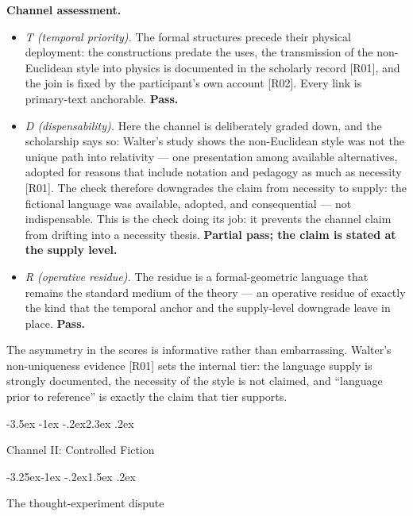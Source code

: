 \documentclass[11pt,a4paper]{article}
\makeatletter
\renewcommand\section{\@startsection{section}{1}{\z@}%
  {-3.5ex \@plus -1ex \@minus -.2ex}{2.3ex \@plus .2ex}%
  {\normalfont\Large\bfseries\raggedright}}
\renewcommand\subsection{\@startsection{subsection}{2}{\z@}%
  {-3.25ex\@plus -1ex \@minus -.2ex}{1.5ex \@plus .2ex}%
  {\normalfont\large\bfseries\raggedright}}
\makeatother
\begin{document}
\textbf{Channel assessment.}

\begin{itemize}[leftmargin=1.6em,itemsep=2pt,parsep=0pt,topsep=3pt]
\item \textit{T (temporal priority).} The formal structures precede their physical deployment: the constructions predate the uses, the transmission of the non-Euclidean style into physics is documented in the scholarly record [R01], and the join is fixed by the participant's own account [R02]. Every link is primary-text anchorable. \textbf{Pass.}
\item \textit{D (dispensability).} Here the channel is deliberately graded down, and the scholarship says so: Walter's study shows the non-Euclidean style was not the unique path into relativity — one presentation among available alternatives, adopted for reasons that include notation and pedagogy as much as necessity [R01]. The check therefore downgrades the claim from necessity to supply: the fictional language was available, adopted, and consequential — not indispensable. This is the check doing its job: it prevents the channel claim from drifting into a necessity thesis. \textbf{Partial pass; the claim is stated at the supply level.}
\item \textit{R (operative residue).} The residue is a formal-geometric language that remains the standard medium of the theory — an operative residue of exactly the kind that the temporal anchor and the supply-level downgrade leave in place. \textbf{Pass.}
\end{itemize}

The asymmetry in the scores is informative rather than embarrassing. Walter's non-uniqueness evidence [R01] sets the internal tier: the language supply is strongly documented, the necessity of the style is not claimed, and ``language prior to reference'' is exactly the claim that tier supports.

\section{Channel II: Controlled Fiction}

\subsection{The thought-experiment dispute}
\end{document}
